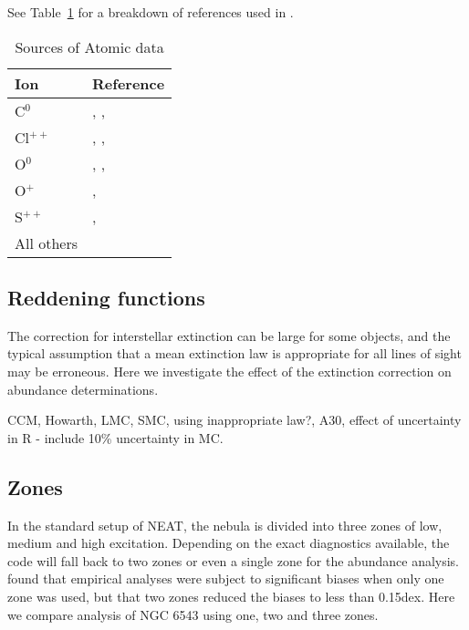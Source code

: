 \documentclass[useAMS,usenatbib]{mn2e}
\begin{document}
See Table~\ref{AD_reftable} for a breakdown of references used in \citet{2011arXiv1108.3800S}.

\begin{table}
        \centering
        \caption{Sources of Atomic data}
        \begin{tabular}{p{0.8cm}|p{6.5cm}}
        Ion &  Reference\\
        \hline
        C$^0$      &    \citet{1976AA....50..141P}, \citet{1987JPhB...20.2553J}, \citet{1979AA....72..129N} \\ 
        Cl$^{++}$  &    \citet{1982MNRAS.198..127M}, \citet{1989AA...208..337B},  \\
        O$^0$      &    \citet{1981PSS...29..377B}, \citet{1988JPhB...21.1083B}, \citet{1988JPhB...21.1455B} \\
        O$^{+}$   &    \citet{1976MNRAS.177...31P}, \citet{1982MNRAS.198..111Z}\\
        S$^{++}$   &    \citet{1982MNRAS.199.1025M}, \citet{1983IAUS..103..143M}        \\
        All others &    \citet{2006ApJS..162..261L} \\
        \end{tabular}
 \label{AD_reftable}    
\end{table}

\subsection{Reddening functions}

The correction for interstellar extinction can be large for some objects, and the typical assumption that a mean extinction law is appropriate for all lines of sight may be erroneous.  Here we investigate the effect of the extinction correction on abundance determinations.

CCM, Howarth, LMC, SMC, using inappropriate law?, A30, effect of uncertainty in R - include 10\% uncertainty in MC.

\subsection{Zones}

In the standard setup of NEAT, the nebula is divided into three zones of low, medium and high excitation.  Depending on the exact diagnostics available, the code will fall back to two zones or even a single zone for the abundance analysis. \citet{2010MNRAS.401.1375E} found that empirical analyses were subject to significant biases when only one zone was used, but that two zones reduced the biases to less than 0.15dex.  Here we compare analysis of NGC 6543 using one, two and three zones.
\end{document}
